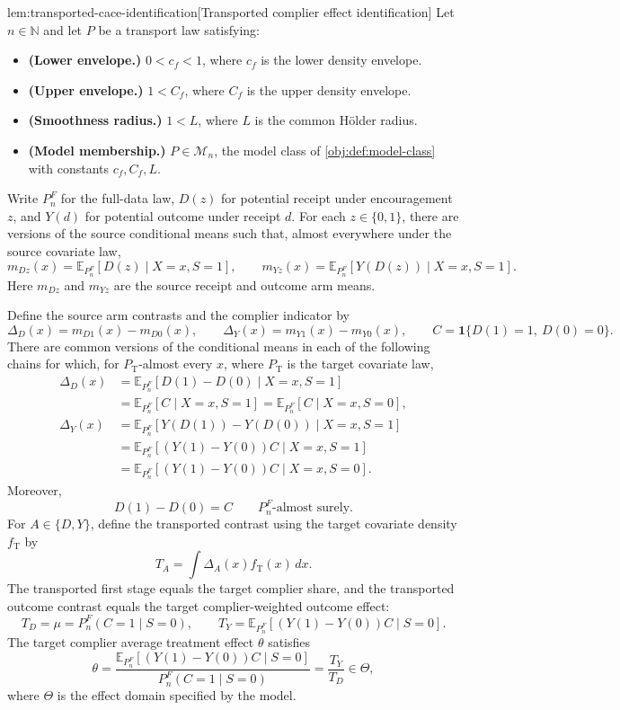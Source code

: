 \documentclass[11pt]{article}
\begin{document}
\begin{lemmav}{lem:transported-cace-identification}[Transported complier effect identification]
Let \(n\in\mathbb N\) and let \(P\) be a transport law satisfying:
\begin{itemize}
\item \textbf{(Lower envelope.)} \(0<c_f<1\), where \(c_f\) is the lower density envelope.
\item \textbf{(Upper envelope.)} \(1<C_f\), where \(C_f\) is the upper density envelope.
\item \textbf{(Smoothness radius.)} \(1<L\), where \(L\) is the common Hölder radius.
\item \textbf{(Model membership.)} \(P\in\mathcal M_n\), the model class of \cref{obj:def:model-class} with constants \(c_f,C_f,L\).
\end{itemize}
Write \(P_n^F\) for the full-data law, \(D(z)\) for potential receipt under encouragement \(z\), and \(Y(d)\) for potential outcome under receipt \(d\). For each \(z\in\{0,1\}\), there are versions of the source conditional means such that, almost everywhere under the source covariate law,
\[
m_{Dz}(x)
 =\mathbb E_{P_n^F}[D(z)\mid X=x,S=1],
\qquad
m_{Yz}(x)
 =\mathbb E_{P_n^F}[Y(D(z))\mid X=x,S=1].
\]
Here \(m_{Dz}\) and \(m_{Yz}\) are the source receipt and outcome arm means.

Define the source arm contrasts and the complier indicator by
\[
\Delta_D(x)=m_{D1}(x)-m_{D0}(x),
\qquad
\Delta_Y(x)=m_{Y1}(x)-m_{Y0}(x),
\qquad
C=\mathbf 1\{D(1)=1,\ D(0)=0\}.
\]
There are common versions of the conditional means in each of the following chains for which, for \(P_{\mathrm T}\)-almost every \(x\), where \(P_{\mathrm T}\) is the target covariate law,
\[
\begin{aligned}
\Delta_D(x)
&=\mathbb E_{P_n^F}[D(1)-D(0)\mid X=x,S=1]\\
&=\mathbb E_{P_n^F}[C\mid X=x,S=1]
 =\mathbb E_{P_n^F}[C\mid X=x,S=0],\\
\Delta_Y(x)
&=\mathbb E_{P_n^F}[Y(D(1))-Y(D(0))\mid X=x,S=1]\\
&=\mathbb E_{P_n^F}[(Y(1)-Y(0))C\mid X=x,S=1]\\
&=\mathbb E_{P_n^F}[(Y(1)-Y(0))C\mid X=x,S=0].
\end{aligned}
\]
Moreover,
\[
D(1)-D(0)=C
\qquad P_n^F\text{-almost surely}.
\]
For \(A\in\{D,Y\}\), define the transported contrast using the target covariate density \(f_{\mathrm T}\) by
\[
T_A=\int \Delta_A(x)f_{\mathrm T}(x)\,dx.
\]
The transported first stage equals the target complier share, and the transported outcome contrast equals the target complier-weighted outcome effect:
\[
T_D=\mu=P_n^F(C=1\mid S=0),
\qquad
T_Y=\mathbb E_{P_n^F}[(Y(1)-Y(0))C\mid S=0].
\]
The target complier average treatment effect \(\theta\) satisfies
\[
\theta
=\frac{\mathbb E_{P_n^F}[(Y(1)-Y(0))C\mid S=0]}
       {P_n^F(C=1\mid S=0)}
=\frac{T_Y}{T_D}
\in\Theta,
\]
where \(\Theta\) is the effect domain specified by the model.
\end{lemmav}
\end{document}
